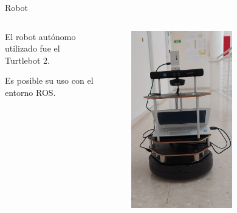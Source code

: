 \documentclass[xcolor=table]{beamer}
\begin{document}
  \begin{frame}{Robot}
    \begin{columns}
      \begin{column}{0.5\textwidth}
        El robot autónomo utilizado fue el Turtlebot 2.

        \vspace{0.5cm}
        Es posible su uso con el entorno ROS.
      \end{column}
      \begin{column}{0.5\textwidth}  
        \begin{figure}[H]
          \centering
          \includegraphics[width=0.65\textwidth]{pic/robot_fisica.jpg}
          \label{fig:robot}
      \end{figure}
      \end{column}
    \end{columns}
  \end{frame}
\end{document}
